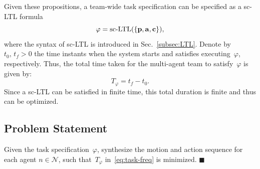 Given these propositions, a team-wide task specification can be specified as a sc-LTL formula
\begin{equation}\label{eq:task}
\varphi=\textup{sc-LTL}(\{\mathbf{p}, \mathbf{a}, \mathbf{c}\}),
\end{equation}
where the syntax of sc-LTL is introduced in Sec.~\ref{subsec:LTL}.
Denote by~$t_0,\, t_f>0$ the time instants when the system starts
and satisfies executing~$\varphi$, respectively.
Thus, the total time taken for the multi-agent team to satisfy~$\varphi$ is given by:
\begin{equation}\label{eq:task-freq}
T_\varphi = t_f-t_0.
\end{equation}
Since a sc-LTL can be satisfied in finite time, this total duration is finite and thus can be optimized. 


\subsection{Problem Statement}\label{subsec:problem-statement}

\begin{problem}\label{prob:formulation}
Given the task specification~$\varphi$,
synthesize the motion and action
sequence for each agent $n\in \mathcal{N}$,
such that~$T_{\varphi}$ in~\eqref{eq:task-freq} is minimized.
\hfill $\blacksquare$
\end{problem}
